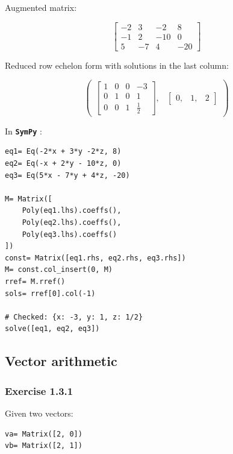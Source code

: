 \documentclass[a4paper]{article}
\newcommand{\sympy}{\textbf{\texttt{\textcolor{OliveGreen}{SymPy}} }}
\begin{document}
Augmented matrix:

\begin{equation}\label{eq:na}
\left[\begin{matrix}-2 & 3 & -2 & 8\\-1 & 2 & -10 & 0\\5 & -7 & 4 & -20\end{matrix}\right]
\end{equation}

Reduced row echelon form with solutions in the last column:

\begin{equation}\label{eq:na}
\begin{pmatrix}\left[\begin{matrix}1 & 0 & 0 & -3 \\
                                   0 & 1 & 0 & 1 \\
                                   0 & 0 & 1 &
\frac{1}{2}\end{matrix}\right], & \begin{bmatrix}0, & 1, & 2\end{bmatrix}\end{pmatrix}
\end{equation}

In \sympy:

\begin{verbatim}
eq1= Eq(-2*x + 3*y -2*z, 8)
eq2= Eq(-x + 2*y - 10*z, 0)
eq3= Eq(5*x - 7*y + 4*z, -20)

M= Matrix([
    Poly(eq1.lhs).coeffs(),
    Poly(eq2.lhs).coeffs(),
    Poly(eq3.lhs).coeffs()
])
const= Matrix([eq1.rhs, eq2.rhs, eq3.rhs])
M= const.col_insert(0, M)
rref= M.rref()
sols= rref[0].col(-1)

# Checked: {x: -3, y: 1, z: 1/2}
solve([eq1, eq2, eq3])
\end{verbatim}

\subsection{Vector arithmetic}

\subsubsection{Exercise 1.3.1}

Given two vectors:

\begin{verbatim}
va= Matrix([2, 0])
vb= Matrix([2, 1])
\end{verbatim}
\end{document}
